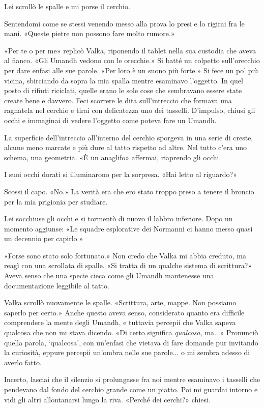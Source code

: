 Lei scrollò le spalle e mi porse il cerchio.

Sentendomi come se stessi venendo messo alla prova lo presi e lo rigirai
fra le mani. «Queste pietre non possono fare molto rumore.»

«Per te o per me» replicò Valka, riponendo il tablet nella sua custodia
che aveva al fianco. «Gli Umandh vedono con le orecchie.» Si batté un
colpetto sull'orecchio per dare enfasi alle sue parole. «Per loro è un
suono più forte.» Si fece un po' più vicina, sbirciando da sopra la mia
spalla mentre esaminavo l'oggetto. In quel posto di rifiuti riciclati,
quelle erano le sole cose che sembravano essere state create bene e
davvero. Feci scorrere le dita sull'intreccio che formava una ragnatela
nel cerchio e tirai con delicatezza uno dei tasselli. D'impulso, chiusi
gli occhi e immaginai di vedere l'oggetto come poteva fare un Umandh.

La superficie dell'intreccio all'interno del cerchio sporgeva in una
serie di creste, alcune meno marcate e più dure al tatto rispetto ad
altre. Nel tutto c'era uno schema, una geometria. «È un anaglifo»
affermai, riaprendo gli occhi.

I suoi occhi dorati si illuminarono per la sorpresa. «Hai letto al
riguardo?»

Scossi il capo. «No.» La verità era che ero stato troppo preso a tenere
il broncio per la mia prigionia per studiare.

Lei socchiuse gli occhi e si tormentò di nuovo il labbro inferiore. Dopo
un momento aggiunse: «Le squadre esplorative dei Normanni ci hanno messo
quasi un decennio per capirlo.»

«Forse sono stato solo fortunato.» Non credo che Valka mi abbia creduto,
ma reagì con una scrollata di spalle. «Si tratta di un qualche sistema
di scrittura?» Aveva senso che una specie cieca come gli Umandh
mantenesse una documentazione leggibile al tatto.

Valka scrollò nuovamente le spalle. «Scrittura, arte, mappe. Non
possiamo saperlo per certo.» Anche questo aveva senso, considerato
quanto era difficile comprendere la mente degli Umandh, e tuttavia
percepii che Valka sapeva qualcosa che non mi stava dicendo. «Di certo
significa \emph{qualcosa}, ma...» Pronunciò quella parola, `qualcosa',
con un'enfasi che vietava di fare domande pur invitando la curiosità,
eppure percepii un'ombra nelle sue parole... o mi sembra adesso di
averlo fatto.

Incerto, lasciai che il silenzio si prolungasse fra noi mentre esaminavo
i tasselli che pendevano dal fondo del cerchio grande come un piatto.
Poi mi guardai intorno e vidi gli altri allontanarsi lungo la riva.
«Perché dei cerchi?» chiesi.

